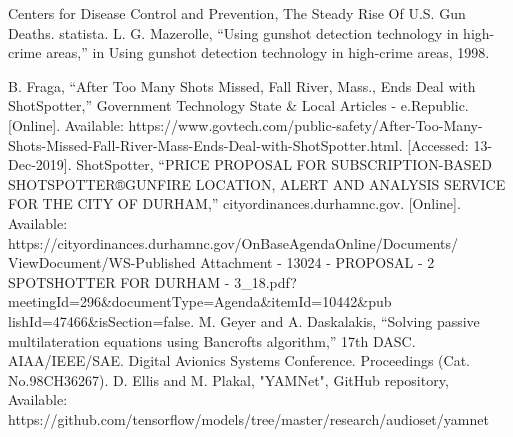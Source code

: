 \documentclass[conference]{IEEEtran}
\begin{document}
\begin{thebibliography}{00}
 Centers for Disease Control and Prevention, The Steady Rise Of U.S. Gun Deaths. statista.
 L. G. Mazerolle, “Using gunshot detection technology in high-crime areas,” in Using gunshot detection technology in high-crime areas, 1998.


 B. Fraga, “After Too Many Shots Missed, Fall River, Mass., Ends Deal with ShotSpotter,” Government Technology State \& Local Articles - e.Republic. [Online]. Available: https://www.govtech.com/public-safety/After-Too-Many-Shots-Missed-Fall-River-Mass-Ends-Deal-with-ShotSpotter.html. [Accessed: 13-Dec-2019].
ShotSpotter, “PRICE PROPOSAL FOR SUBSCRIPTION-BASED SHOTSPOTTER®GUNFIRE LOCATION, ALERT AND ANALYSIS SERVICE FOR THE CITY OF DURHAM,” cityordinances.durhamnc.gov. [Online]. Available: https://cityordinances.durhamnc.gov/OnBaseAgendaOnline/Documents/
ViewDocument/WS-Published Attachment - 13024 - PROPOSAL - 2 SPOTSHOTTER FOR DURHAM - 3\_18.pdf?meetingId=296\&documentType=Agenda\&itemId=10442\&pub
lishId=47466\&isSection=false.
 M. Geyer and A. Daskalakis, “Solving passive multilateration equations using Bancrofts algorithm,” 17th DASC. AIAA/IEEE/SAE. Digital Avionics Systems Conference. Proceedings (Cat. No.98CH36267).
 D. Ellis and M. Plakal, "YAMNet", GitHub repository, Available: https://github.com/tensorflow/models/tree/master/research/audioset/yamnet

\end{thebibliography}
\end{document}
